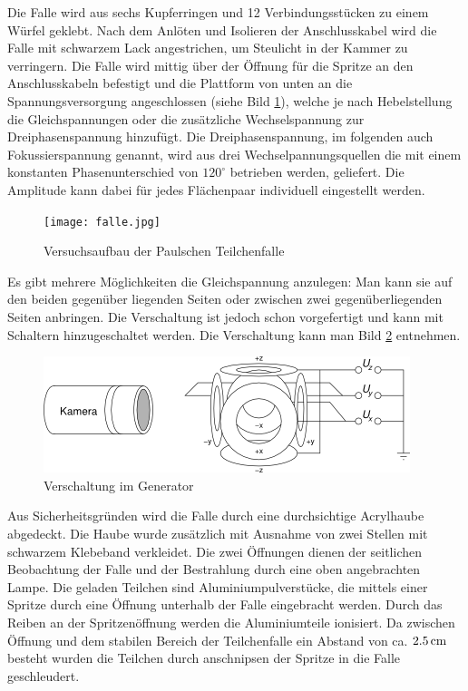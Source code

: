 \documentclass[a4paper,12pt]{article}
\begin{document}
Die Falle wird aus sechs Kupferringen und 12 Verbindungsstücken zu einem Würfel geklebt.
Nach dem Anlöten und Isolieren der Anschlusskabel wird die Falle mit schwarzem Lack angestrichen, um Steulicht in der Kammer zu verringern.
Die Falle wird mittig über der Öffnung für die Spritze an den Anschlusskabeln befestigt und die Plattform von unten an die Spannungsversorgung angeschlossen (siehe Bild \ref{fallenbild}), welche je nach Hebelstellung die Gleichspannungen oder die zusätzliche Wechselspannung zur Dreiphasenspannung hinzufügt.
Die Dreiphasenspannung, im folgenden auch Fokussierspannung genannt, wird aus drei Wechselpannungsquellen die mit einem konstanten Phasenunterschied von $120^\circ$ betrieben werden, geliefert.
Die Amplitude kann dabei für jedes Flächenpaar individuell eingestellt werden.

\begin{figure}[htb]
		\centering
		\texttt{[image: falle.jpg]}
		\caption{Versuchsaufbau der Paulschen Teilchenfalle}
		\label{fallenbild}
\end{figure}

Es gibt mehrere Möglichkeiten die Gleichspannung anzulegen:
Man kann sie auf den beiden gegenüber liegenden Seiten oder zwischen zwei gegenüberliegenden Seiten anbringen.
Die Verschaltung ist jedoch schon vorgefertigt und kann mit Schaltern hinzugeschaltet werden.
Die Verschaltung kann man Bild \ref{verschaltung} entnehmen.
\begin{figure}[htb]
		\centering
		\includegraphics{Schaltbild_3Phasen.png}
		\caption{Verschaltung im Generator}
		\label{verschaltung}
\end{figure}

Aus Sicherheitsgründen wird die Falle durch eine durchsichtige Acrylhaube abgedeckt.
Die Haube wurde zusätzlich mit Ausnahme von zwei Stellen mit schwarzem Klebeband verkleidet.
Die zwei Öffnungen dienen der seitlichen Beobachtung der Falle und der Bestrahlung durch eine oben angebrachten Lampe.
Die geladen Teilchen sind Aluminiumpulverstücke, die mittels einer Spritze durch eine Öffnung unterhalb der Falle eingebracht werden.
Durch das Reiben an der Spritzenöffnung werden die Aluminiumteile ionisiert.
Da zwischen Öffnung und dem stabilen Bereich der Teilchenfalle ein Abstand von ca. $\unit[2.5]{cm}$  besteht wurden die Teilchen durch anschnipsen der Spritze in die Falle geschleudert.
\end{document}
